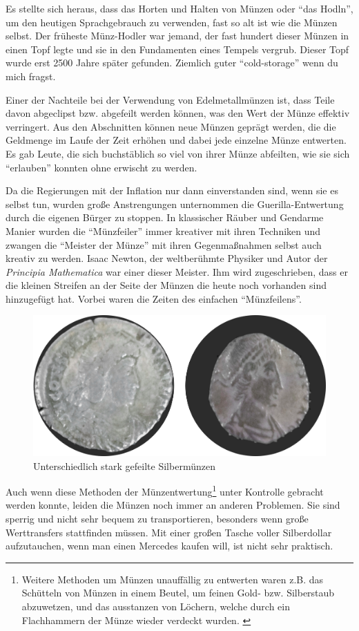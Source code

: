 Es stellte sich heraus, dass das Horten und Halten von Münzen oder “das Hodln”,
um den heutigen Sprachgebrauch zu verwenden, fast so alt ist wie die Münzen
selbst. Der früheste Münz-Hodler war jemand, der fast hundert dieser Münzen in
einen Topf legte und sie in den Fundamenten eines Tempels vergrub. Dieser Topf
wurde erst 2500 Jahre später gefunden. Ziemlich guter \enquote{cold-storage}
wenn du mich fragst.

Einer der Nachteile bei der Verwendung von Edelmetallmünzen ist, dass Teile
davon abgeclipst bzw. abgefeilt werden können, was den Wert der Münze effektiv
verringert. Aus den Abschnitten können neue Münzen geprägt werden, die die
Geldmenge im Laufe der Zeit erhöhen und dabei jede einzelne Münze entwerten. Es
gab Leute, die sich buchstäblich so viel von ihrer Münze abfeilten, wie sie sich
\enquote{erlauben} konnten ohne erwischt zu werden.

Da die Regierungen mit der Inflation nur dann einverstanden sind, wenn sie es
selbst tun, wurden große Anstrengungen unternommen die Guerilla-Entwertung durch
die eigenen Bürger zu stoppen. In klassischer Räuber und Gendarme Manier
wurden die \enquote{Münzfeiler} immer kreativer mit ihren Techniken und zwangen
die \enquote{Meister der Münze} mit ihren Gegenmaßnahmen selbst auch kreativ zu
werden. Isaac Newton, der weltberühmte Physiker und Autor der \textit{Principia
Mathematica} war einer dieser Meister. Ihm wird zugeschrieben, dass er die
kleinen Streifen an der Seite der Münzen die heute noch vorhanden sind
hinzugefügt hat. Vorbei waren die Zeiten des einfachen \enquote{Münzfeilens}.

\begin{figure}
  \includegraphics{assets/images/clipped-coins.png}
  \caption{Unterschiedlich stark gefeilte Silbermünzen}
  \label{fig:clipped-coins}
\end{figure}

Auch wenn diese Methoden der Münzentwertung\footnote{ Weitere Methoden um Münzen
unauffällig zu entwerten waren z.B. das Schütteln von Münzen in einem Beutel, um
feinen Gold- bzw. Silberstaub abzuwetzen, und das ausstanzen von Löchern, welche
durch ein Flachhammern der Münze wieder verdeckt wurden.
\cite{wiki:coin-debasement} } unter Kontrolle gebracht werden konnte, leiden die
Münzen noch immer an anderen Problemen. Sie sind sperrig und nicht sehr bequem
zu transportieren, besonders wenn große Werttransfers stattfinden müssen. Mit
einer großen Tasche voller Silberdollar aufzutauchen, wenn man einen Mercedes
kaufen will, ist nicht sehr praktisch.

